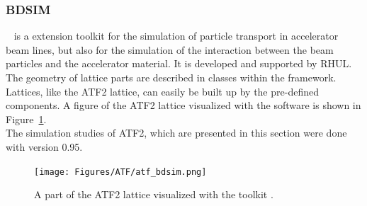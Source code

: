 \subsubsection{BDSIM}
\label{BDSIM}
\bdsim~\cite{BDSIM} is a \geant extension toolkit for the simulation of particle transport in accelerator beam lines, but also for the simulation of the interaction between the beam particles and the accelerator material. 
It is developed and supported by RHUL.
The geometry of lattice parts are described in classes within the \bdsim framework. 
Lattices, like the ATF2 lattice, can easily be built up by the pre-defined components. 
A figure of the ATF2 lattice visualized with the \bdsim software is shown in Figure~\ref{fig:ATF2_BDSIM}.
\\The simulation studies of ATF2, which are presented in this section were done with \bdsim version 0.95.
\begin{figure}[!h]
\centering
\texttt{[image: Figures/ATF/atf\_bdsim.png]}
\caption[ATF2 lattice in \bdsim]{A part of the ATF2 lattice visualized with the \geant toolkit \bdsim.}
\label{fig:ATF2_BDSIM}
\end{figure}

